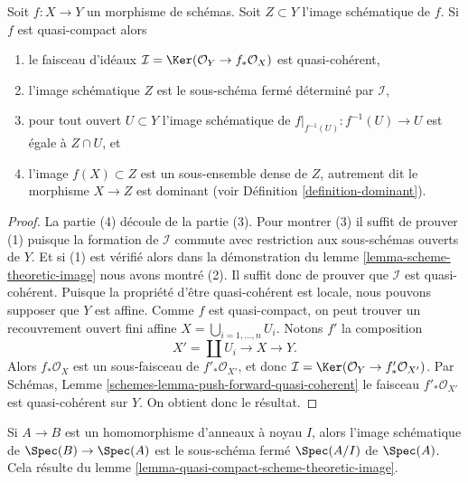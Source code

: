 \begin{lemma}
\label{lemma-quasi-compact-scheme-theoretic-image}
Soit $f : X \to Y$ un morphisme de schémas. Soit
$Z \subset Y$ l'image schématique de $f$. Si $f$
est quasi-compact alors
\begin{enumerate}
\item le faisceau
d'idéaux $\mathcal{I} = \Ker(\mathcal{O}_Y \to f_*\mathcal{O}_X)$ est
quasi-cohérent,
\item l'image schématique $Z$ est le sous-schéma fermé
déterminé par $\mathcal{I}$,
\item pour tout ouvert $U \subset Y$ l'image schématique
de $f|_{f^{-1}(U)} : f^{-1}(U) \to U$ est égale à $Z \cap U$, et
\item l'image $f(X) \subset Z$ est un sous-ensemble dense de $Z$,
autrement dit le morphisme $X \to Z$ est
dominant (voir Définition \ref{definition-dominant}).
\end{enumerate}
\end{lemma}

\begin{proof}
La partie (4) découle de la partie (3). Pour montrer (3) il suffit
de prouver (1) puisque la formation de $\mathcal{I}$ commute avec restriction aux
sous-schémas ouverts de $Y$. Et si (1) est vérifié alors dans
la démonstration du lemme \ref{lemma-scheme-theoretic-image} nous
avons montré (2). Il suffit donc de prouver que $\mathcal{I}$ est quasi-cohérent. Puisque
la propriété d'être quasi-cohérent est locale, nous
pouvons supposer que $Y$ est affine. Comme $f$
est quasi-compact, on peut trouver un recouvrement
ouvert fini affine $X = \bigcup_{i = 1, \ldots, n} U_i$. Notons $f'$ la composition
$$
X' = \coprod U_i \longrightarrow X \longrightarrow Y.
$$
Alors $f_*\mathcal{O}_X$ est un sous-faisceau de $f'_*\mathcal{O}_{X'}$,
et donc $\mathcal{I} = \Ker(\mathcal{O}_Y \to f'_*\mathcal{O}_{X'})$. Par Schémas, Lemme
\ref{schemes-lemma-push-forward-quasi-coherent} le faisceau $f'_*\mathcal{O}_{X'}$ est quasi-cohérent
sur $Y$. On obtient donc le résultat.
\end{proof}

\begin{example}
\label{example-scheme-theoretic-image}
Si $A \to B$ est un homomorphisme d'anneaux à noyau $I$,
alors l'image schématique de $\Spec(B) \to \Spec(A)$ est
le sous-schéma fermé $\Spec(A/I)$ de
$\Spec(A)$. Cela résulte du lemme \ref{lemma-quasi-compact-scheme-theoretic-image}.
\end{example}

